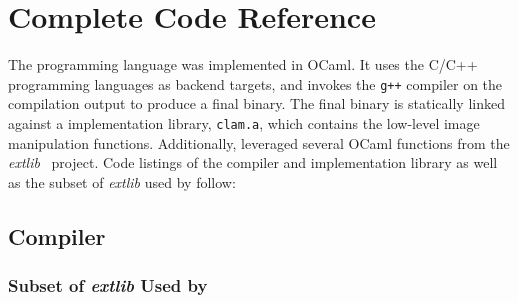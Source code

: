 \chapter{Complete Code Reference}
The \sys{} programming language was implemented in OCaml. It uses the
C/C++ programming languages as backend targets, and invokes the \texttt{g++}
compiler on the \sys{} compilation output to produce a final binary. The
final binary is statically linked against a \sys{} implementation library,
\texttt{clam.a}, which contains the low-level image manipulation functions. Additionally,
\sys{} leveraged several OCaml functions from the \emph{extlib}~\cite{extlib:googlecode}
project. Code listings of the \sys{} compiler and \sys{} implementation library
as well as the subset of \emph{extlib} used by \sys{} follow:

\clearpage
\section{\sys{} Compiler}
 \clearpage
 \clearpage
 \clearpage
 \clearpage
 \clearpage
 \clearpage
 \clearpage
 \clearpage
 \clearpage
 \clearpage
 \clearpage
 \clearpage
 \clearpage

\subsection{Subset of \emph{extlib} Used by \sys{}}
 \clearpage
 \clearpage
 \clearpage
 \clearpage
 \clearpage
 \clearpage

